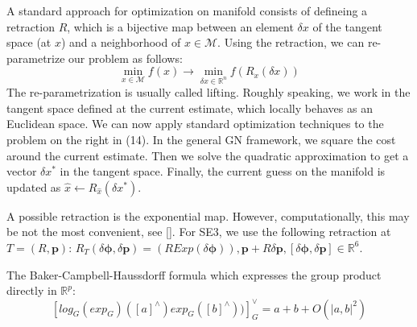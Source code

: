 \documentclass[a4paper]{report}
\begin{document}
A standard approach for optimization on manifold consists of defineing a retraction $R$, which is a bijective map between an element $\delta x$ of the tangent space (at $x$) and a neighborhood of $x \in \mathcal{M}$. Using the retraction, we can re-parametrize our problem as follows:
\begin{equation}
{\operatorname*{min}_{x \in \mathcal{M}} {f(x)}} \rightarrow {\operatorname*{min}_{\delta x \in \mathbb{R}^n} {f(R_x(\delta x))}}
\end{equation}
The re-parametrization is usually called lifting. Roughly speaking, we work in the tangent space defined at the current estimate, which locally behaves as an Euclidean space. We can now apply standard optimization techniques to the problem on the right in (14). In the general GN framework, we square the cost around the current estimate. Then we solve the quadratic approximation to get a vector $\delta x^*$ in the tangent space. Finally, the current guess on the manifold is updated as $\hat{x} \leftarrow R_{\hat{x}}(\delta x^*)$. 

A possible retraction is the exponential map. However, computationally, this may be not the most convenient, see [].
For SE3, we use the following retraction at $T=(R,\bm{p})$:
$R_T(\delta \bm{\phi}, \delta \bm{p})=(R Exp(\delta \bm{\phi})), \bm{p}+R\delta \bm{p}, [\delta \bm{\phi}, \delta \bm{p}]\in \mathbb{R}^6$.

The Baker-Campbell-Haussdorff formula which expresses the group product directly in $\mathbb{R}^p$:
$$
[log_G{(exp_G)([a]^\land)exp_G([b]^\land))}]_G^\vee = a + b + O(|a,b|^2)
$$
\end{document}
